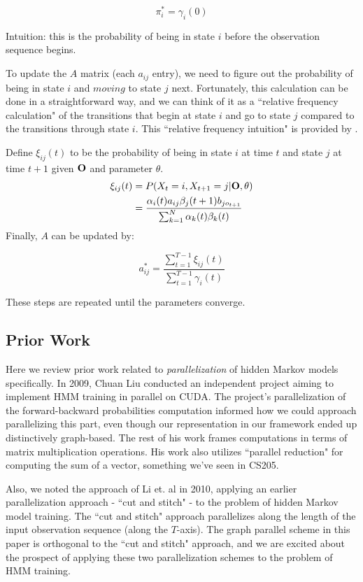 \begin{equation}\label{pi}
\pi_i^* = \gamma_i(0)
\end{equation}

Intuition: this is the probability of being in state $i$ before the observation sequence begins.  

To update the $A$ matrix (each $a_{ij}$ entry), we need to figure  out the probability of being in state $i$ and $\textit{moving}$ to state $j$ next.  Fortunately, this calculation can be done in a straightforward way, and we can think of it as a ``relative frequency calculation" of the transitions that begin at state $i$ and go to state $j$ compared to the transitions through state $i$.  This ``relative frequency intuition" is provided by \cite{rabiner1986introduction}.

Define $\xi_{ij}(t)$ to be the probability of being in state $i$ at time $t$ and state $j$ at time $t+1$ given $\bold{O}$ and parameter $\theta$. 
\begin{equation}\label{xi}
\begin{aligned}
\xi_{ij}(t) &= P(X_t = i, X_{t+1} = j | \bold{O}, \theta)  \\
&=\frac{\alpha_i(t) a_{ij} \beta_j(t+1)b_{jo_{t+1}}}{\sum_{k=1}^N \alpha_k(t) \beta_k(t)}
\end{aligned}
\end{equation}
Finally, $A$ can be updated by: 

\begin{equation}\label{a}
a^*_{ij} = \frac{\sum_{t=1}^{T-1}\xi_{ij}(t)}{\sum_{t=1}^{T-1}\gamma_i(t)}
\end{equation}

These steps are repeated until the parameters converge. 

\subsection{Prior Work}

Here we review prior work related to \textit{parallelization} of hidden Markov models specifically.  In 2009, Chuan Liu conducted an independent project aiming to implement HMM training in parallel on CUDA.  The project's parallelization of the  forward-backward probabilities computation informed how we could approach parallelizing this part, even though our representation in our framework ended up distinctively graph-based.  The rest of his work frames computations in terms of matrix multiplication operations.  His work also utilizes ``parallel reduction" for computing the sum of a vector, something we've seen in CS205.  \cite{cuda-hmm}

Also, we noted the approach of Li et. al in 2010, applying an earlier parallelization approach - ``cut and stitch" - to the problem of hidden Markov model training.  The ``cut and stitch" approach parallelizes along the length of the input observation sequence (along the $T$-axis).  The graph parallel scheme in this paper is orthogonal to the ``cut and stitch" approach, and we are excited about the prospect of applying these two parallelization schemes to the problem of HMM training. \cite{cut-stitch}